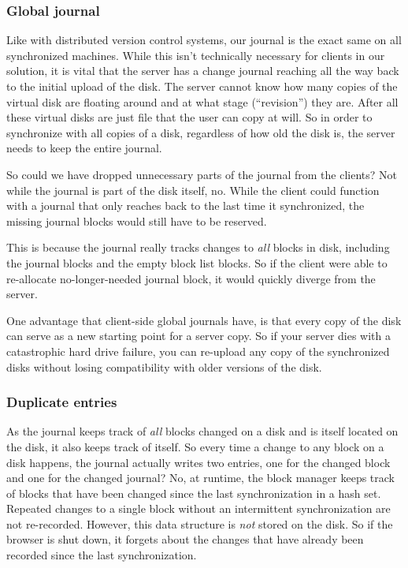 \documentclass[a4paper,12pt]{article}
\begin{document}
\subsubsection{Global journal}
Like with distributed version control systems, our journal is the exact same on all synchronized machines.
While this isn't technically necessary for clients in our solution, it is vital that the server has a change journal reaching all the way back to the initial upload of the disk.
The server cannot know how many copies of the virtual disk are floating around and at what stage (``revision'') they are.
After all these virtual disks are just file that the user can copy at will.
So in order to synchronize with all copies of a disk, regardless of how old the disk is, the server needs to keep the entire journal.

So could we have dropped unnecessary parts of the journal from the clients? 
Not while the journal is part of the disk itself, no.
While the client could function with a journal that only reaches back to the last time it synchronized, the missing journal blocks would still have to be reserved.

This is because the journal really tracks changes to \emph{all} blocks in disk, including the journal blocks and the empty block list blocks. 
So if the client were able to re-allocate no-longer-needed journal block, it would quickly diverge from the server.

One advantage that client-side global journals have, is that every copy of the disk can serve as a new starting point for a server copy.
So if your server dies with a catastrophic hard drive failure, you can re-upload any copy of the synchronized disks without losing compatibility with older versions of the disk.

\subsubsection{Duplicate entries}
As the journal keeps track of \emph{all} blocks changed on a disk and is itself located on the disk, it also keeps track of itself.
So every time a change to any block on a disk happens, the journal actually writes two entries, one for the changed block and one for the changed journal?
No, at runtime, the block manager keeps track of blocks that have been changed since the last synchronization in a hash set.
Repeated changes to a single block without an intermittent synchronization are not re-recorded.
However, this data structure is \emph{not} stored on the disk. 
So if the browser is shut down, it forgets about the changes that have already been recorded since the last synchronization.
\end{document}
